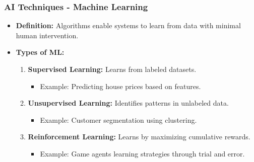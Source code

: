 \documentclass{beamer}
\begin{document}
\begin{frame}
    \frametitle{AI Techniques - Machine Learning}
    \begin{itemize}
        \item \textbf{Definition:} Algorithms enable systems to learn from data with minimal human intervention.
        \item \textbf{Types of ML:}
        \begin{enumerate}
            \item \textbf{Supervised Learning:} Learns from labeled datasets.
                \begin{itemize}
                    \item Example: Predicting house prices based on features.
                \end{itemize}
            \item \textbf{Unsupervised Learning:} Identifies patterns in unlabeled data.
                \begin{itemize}
                    \item Example: Customer segmentation using clustering.
                \end{itemize}
            \item \textbf{Reinforcement Learning:} Learns by maximizing cumulative rewards.
                \begin{itemize}
                    \item Example: Game agents learning strategies through trial and error.
                \end{itemize}
        \end{enumerate}
    \end{itemize}
\end{frame}
\end{document}
